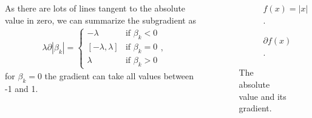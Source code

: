 \documentclass[aspectratio=169,10pt]{beamer}
\begin{document}
\begin{frame}{\secname}{\subsecname}
  \begin{columns}
    \begin{column}{.7\textwidth}
      As there are lots of lines tangent to the absolute value in zero, we can summarize the subgradient as
      \begin{align}
        \lambda\partial|\beta_k| =
        \begin{cases}
          -\lambda &\text{if } \beta_k < 0 \\
          [-\lambda, \lambda] &\text{if } \beta_k = 0\\
          \lambda &\text{if } \beta_k > 0
        \end{cases},
      \end{align}
      for $\beta_k = 0$ the gradient can take all values between -1 and 1.
    \end{column}
    \begin{column}{.3\textwidth}      
      \begin{figure}
        \begin{subfigure}[t]{\textwidth}
          \centering
          \caption{$f(x) = |x|$.}
        \end{subfigure}
        \vfill
        \begin{subfigure}[t]{\textwidth}
          \centering
          \caption{$\partial f(x)$.}
        \end{subfigure}
        \caption{The absolute value and its gradient.}
      \end{figure}
    \end{column}
  \end{columns}
\end{frame}
\end{document}
